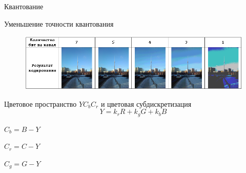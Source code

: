 \documentclass[11pt]{beamer}
\begin{document}
\begin{frame}{Квантование}
\begin{block}{Уменьшение точности квантования}
\begin{figure}[H]
	\begin{center}
		\includegraphics[scale=0.48]{../pics/quantization/quantization.png}
	\end{center}
\end{figure}	
\end{block}				
\end{frame}



\begin{frame}{Цветовое пространство $YC_bC_r$ и цветовая субдискретизация}
	\begin{displaymath}
		Y = k_rR + k_gG + k_bB
	\end{displaymath}

	\begin{center}
		$C_b = B - Y$

		$C_r = C - Y$

		$C_g = G - Y$
	\end{center}
\end{frame}
\end{document}

